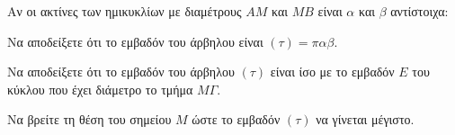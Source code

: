 Αν οι ακτίνες των ημικυκλίων με διαμέτρους $AM$ και $MB$ είναι $\alpha$ και $\beta$ αντίστοιχα:
\begin{alist}
    \item Να αποδείξετε ότι το εμβαδόν του άρβηλου είναι $(\tau) = \pi \alpha \beta$. 
    \item Να αποδείξετε ότι το εμβαδόν του άρβηλου $(\tau)$ είναι ίσο με το εμβαδόν $E$ του κύκλου που έχει διάμετρο το τμήμα $M\Gamma$. 
    \item Να βρείτε τη θέση του σημείου $M$ ώστε το εμβαδόν $(\tau)$ να γίνεται μέγιστο. 
\end{alist}